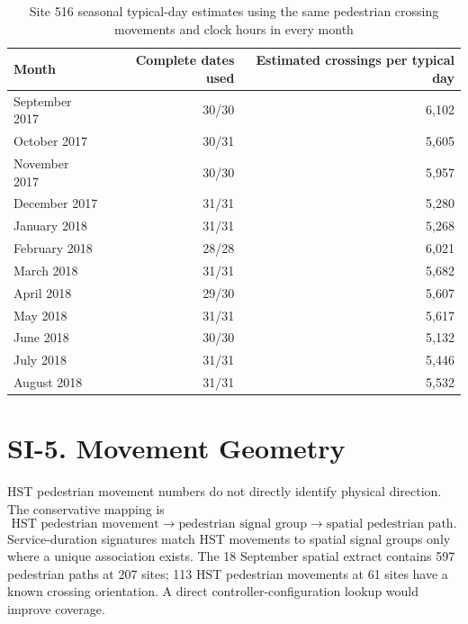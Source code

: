 \documentclass[11pt]{article}
\begin{document}
\begin{table}[htbp]
\centering
\caption{Site 516 seasonal typical-day estimates using the same pedestrian crossing movements and clock hours in every month}
\label{tab:site516-month}
\footnotesize
\begin{tabular}{@{}lrr@{}}
\toprule
Month & Complete dates used & Estimated crossings per typical day \\
\midrule
September 2017 & 30/30 & 6{,}102 \\
October 2017   & 30/31 & 5{,}605 \\
November 2017  & 30/30 & 5{,}957 \\
December 2017  & 31/31 & 5{,}280 \\
January 2018   & 31/31 & 5{,}268 \\
February 2018  & 28/28 & 6{,}021 \\
March 2018     & 31/31 & 5{,}682 \\
April 2018     & 29/30 & 5{,}607 \\
May 2018       & 31/31 & 5{,}617 \\
June 2018      & 30/30 & 5{,}132 \\
July 2018      & 31/31 & 5{,}446 \\
August 2018    & 31/31 & 5{,}532 \\
\bottomrule
\end{tabular}
\end{table}





\section*{SI-5. Movement Geometry}

HST pedestrian movement numbers do not directly identify physical direction. The conservative mapping is
\begin{equation}
\text{HST pedestrian movement}
\rightarrow
\text{pedestrian signal group}
\rightarrow
\text{spatial pedestrian path}.
\end{equation}
Service-duration signatures match HST movements to spatial signal groups only where a unique association exists. The 18 September spatial extract contains 597 pedestrian paths at 207 sites; 113 HST pedestrian movements at 61 sites have a known crossing orientation. A direct controller-configuration lookup would improve coverage.
\end{document}
